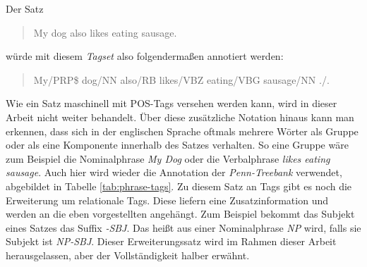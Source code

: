 Der Satz
\begin{quote}
My dog also likes eating sausage.
\end{quote}
würde mit diesem \textit{Tagset} also folgendermaßen annotiert werden:
\begin{quote}
My/PRP\$ dog/NN also/RB likes/VBZ eating/VBG sausage/NN ./.
\end{quote}
Wie ein Satz maschinell mit POS-Tags versehen werden kann, wird in dieser Arbeit nicht weiter behandelt. 
Über diese zusätzliche Notation hinaus kann man erkennen, dass sich in der englischen Sprache oftmals mehrere Wörter als Gruppe oder als eine Komponente innerhalb des Satzes verhalten. So eine Gruppe wäre zum Beispiel die Nominalphrase \textit{My Dog} oder die Verbalphrase \textit{likes eating sausage}. Auch hier wird wieder die Annotation der \textit{Penn-Treebank} verwendet, abgebildet in Tabelle \ref{tab:phrase-tags}. Zu diesem Satz an Tags gibt es noch die Erweiterung um relationale Tags. Diese liefern eine Zusatzinformation und werden an die eben vorgestellten angehängt. Zum Beispiel bekommt das Subjekt eines Satzes das Suffix \textit{-SBJ}. Das heißt aus einer Nominalphrase \textit{NP} wird, falls sie Subjekt ist \textit{NP-SBJ}. Dieser Erweiterungssatz wird im Rahmen dieser Arbeit herausgelassen, aber der Vollständigkeit halber erwähnt.
